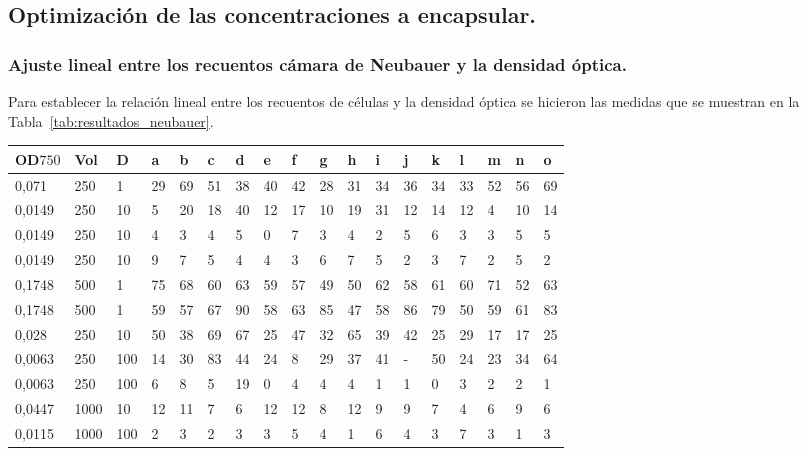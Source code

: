 \subsection{Optimización de las concentraciones a encapsular.}

\subsubsection{Ajuste lineal entre los recuentos cámara de Neubauer y la densidad óptica.}

Para establecer la relación lineal entre los recuentos de células y la densidad óptica se hicieron las medidas que se muestran en la Tabla~\ref{tab:resultados_neubauer}.

\begin{spacing}{1}

\begin{table}[H]
\renewcommand\tablename{Tabla}
\renewcommand{\arraystretch}{1.5}
\centering
    
    \setlength{\extrarowheight}{-2pt}
    \begin{tabular}{ R{1.2cm} C{0.8cm} C{1.1cm} C{0.4cm} C{0.4cm} C{0.4cm} C{0.4cm} C{0.4cm} C{0.4cm} C{0.4cm} C{0.4cm} C{0.4cm} C{0.4cm} C{0.4cm} C{0.4cm} C{0.4cm} C{0.4cm} C{0.4cm} }
        \hline
        OD\small{$750$}	& Vol & D & a & b & c & d & e & f & g & h & i & j & k & l & m & n & o \\
        \hline
        \hline
        

0,071	&	250	&	1	&	29	&	69	&	51	&	38	&	40	&	42	&	28	&	31	&	34	&	36	&	34	&	33	&	52	&	56	&	69	\\
0,0149	&	250	&	10	&	5	&	20	&	18	&	40	&	12	&	17	&	10	&	19	&	31	&	12	&	14	&	12	&	4	&	10	&	14	\\
0,0149	&	250	&	10	&	4	&	3	&	4	&	5	&	0	&	7	&	3	&	4	&	2	&	5	&	6	&	3	&	3	&	5	&	5	\\
0,0149	&	250	&	10	&	9	&	7	&	5	&	4	&	4	&	3	&	6	&	7	&	5	&	2	&	3	&	7	&	2	&	5	&	2	\\
0,1748	&	500	&	1	&	75	&	68	&	60	&	63	&	59	&	57	&	49	&	50	&	62	&	58	&	61	&	60	&	71	&	52	&	63	\\
0,1748	&	500	&	1	&	59	&	57	&	67	&	90	&	58	&	63	&	85	&	47	&	58	&	86	&	79	&	50	&	59	&	61	&	83	\\
0,028	&	250	&	10	&	50	&	38	&	69	&	67	&	25	&	47	&	32	&	65	&	39	&	42	&	25	&	29	&	17	&	17	&	25	\\
0,0063	&	250	&	100	&	14	&	30	&	83	&	44	&	24	&	8	&	29	&	37	&	41	&	-	&	50	&	24	&	23	&	34	&	64	\\
0,0063	&	250	&	100	&	6	&	8	&	5	&	19	&	0	&	4	&	4	&	4	&	1	&	1	&	0	&	3	&	2	&	2	&	1	\\
0,0447	&	1000	&	10	&	12	&	11	&	7	&	6	&	12	&	12	&	8	&	12	&	9	&	9	&	7	&	4	&	6	&	9	&	6	\\
0,0115	&	1000	&	100	&	2	&	3	&	2	&	3	&	3	&	5	&	4	&	1	&	6	&	4	&	3	&	7	&	3	&	1	&	3	\\
        

\end{tabular}
\end{table}
\end{spacing}
